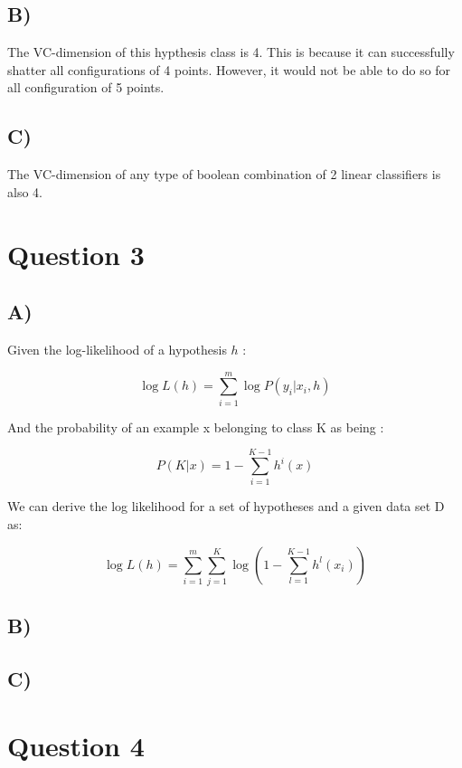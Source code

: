 \documentclass{report}
\begin{document}
\subsection*{B)}
The VC-dimension of this hypthesis class is 4. This is because it can successfully
shatter all configurations of 4 points. However, it would not be able to do so for all
configuration of 5 points.
\subsection*{C)}
The VC-dimension of any type of boolean combination of 2 linear classifiers is
also 4.

\section*{Question 3}
\subsection*{A)}
Given the log-likelihood of a hypothesis $h$ :

\begin{equation}
  \log L(h) = \sum_{i=1}^{m} \log P(y_i|x_i,h)
\end{equation}

And the probability of an example x belonging to class K as being :

\begin{equation}
  P(K | x) = 1 - \sum_{i=1}^{K-1}h^i(x)
\end{equation}

We can derive the log likelihood for a set of hypotheses and a given data set D as:

\begin{equation}
  \log L(h) = \sum_{i=1}^{m} \sum_{j=1}^{K} \log \left( 1 - \sum_{l=1}^{K-1}h^l(x_i) \right)
\end{equation}


\subsection*{B)}
\subsection*{C)}

\section*{Question 4}
\end{document}

